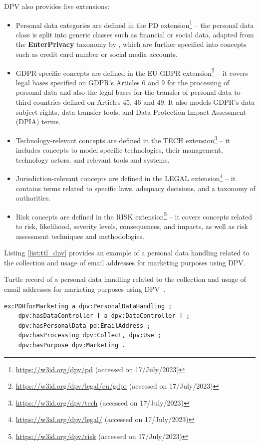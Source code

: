 DPV also provides five extensions:
\begin{itemize}
    \item Personal data categories are defined in the PD extension\footnote{\url{https://w3id.org/dpv/pd} (accessed on 17/July/2023)} -- the personal data class is split into generic classes such as financial or social data, adapted from the \textbf{EnterPrivacy} taxonomy by \cite{cronk_categories_2017}, which are further specified into concepts such as credit card number or social media accounts.
    \item GDPR-specific concepts are defined in the EU-GDPR extension\footnote{\url{https://w3id.org/dpv/legal/eu/gdpr} (accessed on 17/July/2023)} -- it covers legal bases specified on GDPR's Articles 6 and 9 for the processing of personal data and also the legal bases for the transfer of personal data to third countries defined on Articles 45, 46 and 49. It also models GDPR's data subject rights, data transfer tools, and Data Protection Impact Assessment (DPIA) terms.
    \item Technology-relevant concepts are defined in the TECH extension\footnote{\url{https://w3id.org/dpv/tech} (accessed on 17/July/2023)} -- it includes concepts to model specific technologies, their management, technology actors, and relevant tools and systems.
    \item Jurisdiction-relevant concepts are defined in the LEGAL extension\footnote{\url{https://w3id.org/dpv/legal/} (accessed on 17/July/2023)} -- it contains terms related to specific laws, adequacy decisions, and a taxonomy of authorities.
    \item Risk concepts are defined in the RISK extension\footnote{\url{https://w3id.org/dpv/risk} (accessed on 17/July/2023)} -- it covers concepts related to risk, likelihood, severity levels, consequences, and impacts, as well as risk assessment techniques and methodologies.
\end{itemize}

Listing \ref{list:ttl_dpv} provides an example of a personal data handling related to the collection and usage of email addresses for marketing purposes using DPV.

\begin{listing}[ht]
\caption{Turtle record of a personal data handling related to the collection and usage of email addresses for marketing purposes using DPV~\citep{panetto_creating_2019}.}
\label{list:ttl_dpv}
\begin{verbatim}
ex:PDHforMarketing a dpv:PersonalDataHandling ;
    dpv:hasDataController [ a dpv:DataController ] ;
    dpv:hasPersonalData pd:EmailAddress ;
    dpv:hasProcessing dpv:Collect, dpv:Use ;
    dpv:hasPurpose dpv:Marketing .
\end{verbatim}
\end{listing}


